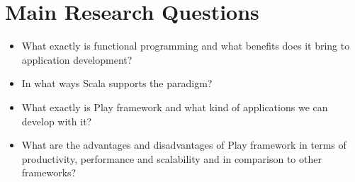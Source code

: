 \documentclass[12pt,twoside,a4paper]{report}
\begin{document}
\section{Main Research Questions}\label{1.3}
\begin{itemize}\itemsep1pt \parskip0pt 
\item What exactly is functional programming and what benefits does it bring to application development?
\item In what ways Scala supports the paradigm?
\item What exactly is Play framework and what kind of applications we can develop with it?
\item What are the advantages and disadvantages of Play framework in terms of productivity, performance and scalability and in comparison to other frameworks?
\end{itemize}
\end{document}
